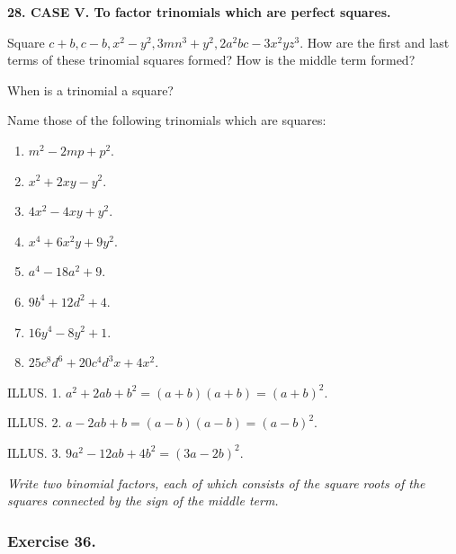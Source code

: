 \documentclass{book}
\begin{document}
\textbf{ 28. CASE V. To factor trinomials which are perfect
squares.}

Square $c+b, c-b, x^2-y^2, 3mn^3+y^2, 2a^2bc-3x^2yz^3$. How are
the first and last terms of these trinomial squares formed? How is
the middle term formed?

When is a trinomial a square?

Name those of the following trinomials which are squares:
\begin{enumerate}

\item $m^2-2mp+p^2$.

\item $x^2+2xy-y^2$.

\item $4x^2-4xy+y^2$.

\item $x^4+6x^2y+9y^2$.

\item $a^4-18a^2+9$.

\item $9b^4+12d^2+4$.

\item $16y^4-8y^2+1$.

\item $25c^8d^6+20c^4d^3x+4x^2$.
\end{enumerate}

ILLUS. 1. $a^2+2ab+b^2=(a+b)(a+b)=(a+b)^2$.

ILLUS. 2. $a-2ab+b=(a-b)(a-b)=(a-b)^2$.

ILLUS. 3. $9a^2-12ab+4b^2=(3a-2b)^2$.

\textit{ Write two binomial factors, each of which consists of the
square roots of the squares connected by the sign of the middle
term.}


\subsubsection*{Exercise 36.}
\end{document}

